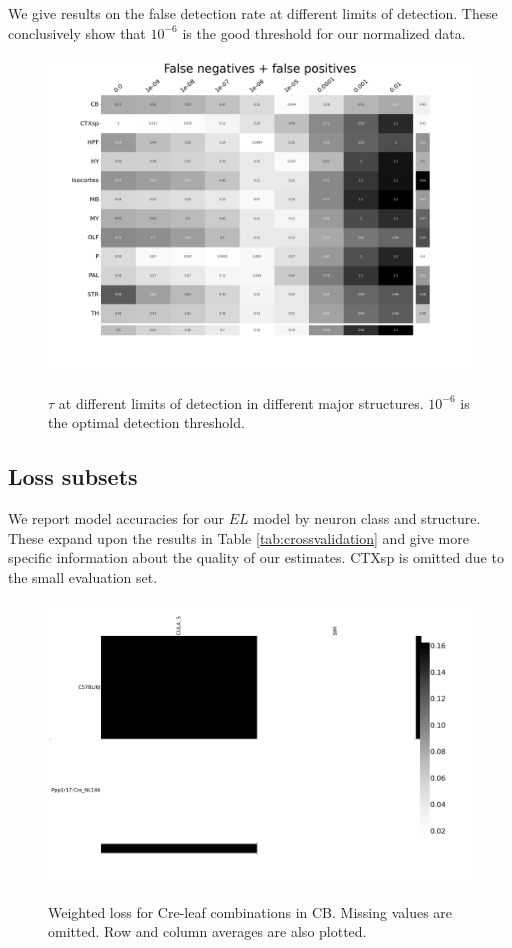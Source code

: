 We give results on the false detection rate at different limits of detection.
These conclusively show that $10^{-6}$ is the good threshold for our normalized data.
\begin{figure}[H]
    \centering
    \includegraphics[width = 7in]{figs/Threshold.png}
    \label{fig:threshold}
    \caption{$\tau$ at different limits of detection in different major structures.  $10^{-6}$ is the optimal detection threshold.}
\end{figure}

\newpage

\subsection{Loss subsets}
\label{supp_sec:loss_subsets}

We report model accuracies for our $EL$ model by neuron class and structure.
These expand upon the results in Table \ref{tab:crossvalidation} and give more specific information about the quality of our estimates. 
CTXsp is omitted due to the small evaluation set.

\begin{figure}[H]
    \centering
    \includegraphics[width = 7in]{figs/lossdetails_512.png} 
    \label{fig:distances}
    \caption{Weighted loss for Cre-leaf combinations in CB.  Missing values are omitted.   Row and column averages are also plotted.}
\end{figure}

